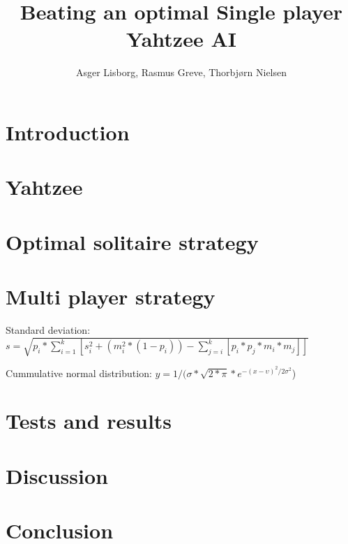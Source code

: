 \documentclass[twocolumn]{article}
\title{Beating an optimal Single player Yahtzee AI}
\author{Asger Lisborg, Rasmus Greve, Thorbjørn Nielsen}
\begin{document}
\maketitle

\begin{abstract}

\end{abstract}


\section{Introduction}


\section{Yahtzee}


\section{Optimal solitaire strategy}

\label{sec:optimalSingleAI}

\section{Multi player strategy}

\label{sec:subOptimalMPAI}

Standard deviation: $s = \sqrt{p_i * \sum_{i=1}^{k} \left[s_i^2 + (m_i^2 * (1 - p_i)) - \sum_{j=i}^{k} \left[p_i * p_j * m_i * m_j\right]\right]}$

Cummulative normal distribution: $y = 1 /(\sigma * \sqrt{2 * \pi} * e^{-(x - \upsilon)^2 / 2 \sigma^2}$)

\section{Tests and results}

\label{sec:testsAndResults}


\section{Discussion}


\section{Conclusion}





\end{document}

